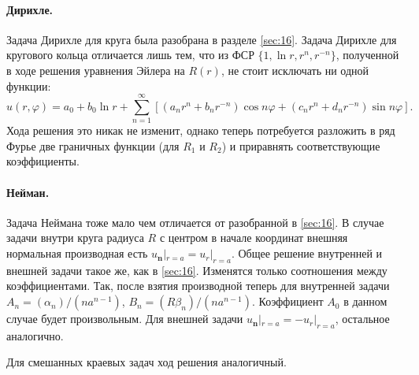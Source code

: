 \paragraph{Дирихле.} Задача Дирихле для круга была разобрана в разделе \ref{sec:16}. Задача Дирихле
для кругового кольца отличается лишь тем, что из ФСР $ \{1, \ln r, r^n, r^{-n}\}
$, полученной в ходе решения уравнения Эйлера на $ R(r) $, не стоит исключать ни
одной функции:
\[
  u(r,\varphi) = a_0 + b_0\ln r + \sum_{n=1}^\infty [(a_nr^n + b_nr^{-n})\cos
  n\varphi + (c_n r^n + d_n r^{-n})\sin n\varphi].
\]
Хода решения это никак не изменит, однако теперь потребуется
разложить в ряд Фурье две граничных функции (для $ R_1 $ и $ R_2 $) и приравнять
соответствующие коэффициенты.

\paragraph{Нейман.} 
Задача Неймана тоже мало чем отличается от разобранной в \ref{sec:16}. В случае задачи внутри круга радиуса $ R $ с центром
в начале координат внешняя нормальная производная есть $ u_{\mathbf n}|_{r = a}
= u_r|_{r = a}$. Общее решение внутренней и внешней задачи такое же, как в
\ref{sec:16}. Изменятся только соотношения между коэффициентами. Так, после
взятия производной теперь для
внутренней задачи $
A_n = (\alpha_n)/(na^{n-1}) $, $ B_n = (R\beta_n)/(na^{n-1}) $. Коэффициент $
A_0 $ в данном случае будет произвольным. Для внешней задачи $
u_{\mathbf n}|_{r=a} = -u_r|_{r=a} $, остальное аналогично.

Для смешанных краевых задач ход решения аналогичный.
